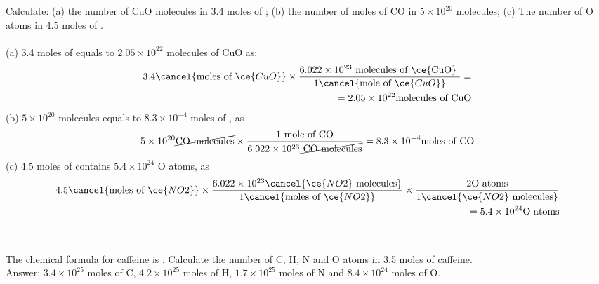 \documentclass[main.tex]{subfiles}
\begin{document}
\begin{description}
\begin{example} %
Calculate: (a) the number of CuO molecules in 3.4 moles of ; (b) the number of moles of CO in $5\times 10^{20}$  molecules; (c) The number of O atoms in 4.5 moles of . \\
\\
(a) 3.4 moles of  equals to $2.05\times 10^{22}$ molecules of CuO as:
\begin{equation*}\begin{split}
3.4   \cancel{\text{moles of }\ce{CuO}} \times
\dfrac{6.022\times 10^{23} \text{ molecules of \ce{CuO} }  } {  1\cancel{\text{mole of  }\ce{CuO}}}=\\
=2.05\times 10^{22} \text{molecules of CuO}
\end{split}\end{equation*}
(b) $5\times 10^{20}$  molecules equals to $8.3\times 10^{-4}$ moles of , as
\begin{equation*}
5\times 10^{20}   \cancel{\text{CO molecules}} \times
\dfrac{ 1\text{ mole of CO}  } { 6.022\times 10^{23} \cancel{\text{ CO molecules}}   }
=8.3\times 10^{-4} \text{moles of CO}
\end{equation*}
(c) 4.5 moles of  contains $5.4\times 10^{24}$ O atoms, as
 \begin{equation*}\begin{split}
4.5  \cancel{\text{moles of }\ce{NO2}} \times 
\dfrac{6.022\times 10^{23} \cancel{\ce{NO2} \text{ molecules}}  } {  1\cancel{\text{moles of }\ce{NO2}}} 
\times\dfrac{2 \text{O atoms}}{1\cancel{\ce{NO2} \text{ molecules}}}\\
=5.4\times 10^{24}\text{O atoms}
\end{split}\end{equation*}\\
\faDiamond\ \\
The chemical formula for caffeine is . Calculate the number of C, H, N and O atoms in 3.5 moles of caffeine. \\
\flushright Answer: $3.4\times 10^{25}$ moles of C, $4.2\times 10^{25}$ moles of H, $1.7\times 10^{25}$ moles of N and $8.4\times 10^{24}$ moles of O.
\end{example}%


\end{description}
	
\end{document}
